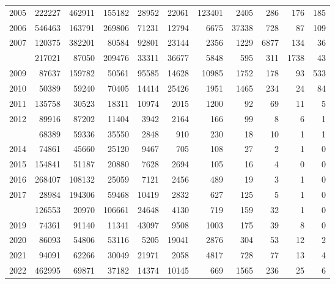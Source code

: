 \documentclass[
]{article}
\begin{document}
\begin{longtable}[t]{lrrrrrrrrrr}
2005 & 222227 & 462911 & 155182 & 28952 & 22061 & 123401 & 2405 & 286 & 176 & 185\\
2006 & 546463 & 163791 & 269806 & 71231 & 12794 & 6675 & 37338 & 728 & 87 & 109\\
2007 & 120375 & 382201 & 80584 & 92801 & 23144 & 2356 & 1229 & 6877 & 134 & 36\\
\addlinespace
2008 & 217021 & 87050 & 209476 & 33311 & 36677 & 5848 & 595 & 311 & 1738 & 43\\
2009 & 87637 & 159782 & 50561 & 95585 & 14628 & 10985 & 1752 & 178 & 93 & 533\\
2010 & 50389 & 59240 & 70405 & 14414 & 25426 & 1951 & 1465 & 234 & 24 & 84\\
2011 & 135758 & 30523 & 18311 & 10974 & 2015 & 1200 & 92 & 69 & 11 & 5\\
2012 & 89916 & 87202 & 11404 & 3942 & 2164 & 166 & 99 & 8 & 6 & 1\\
\addlinespace
2013 & 68389 & 59336 & 35550 & 2848 & 910 & 230 & 18 & 10 & 1 & 1\\
2014 & 74861 & 45660 & 25120 & 9467 & 705 & 108 & 27 & 2 & 1 & 0\\
2015 & 154841 & 51187 & 20880 & 7628 & 2694 & 105 & 16 & 4 & 0 & 0\\
2016 & 268407 & 108132 & 25059 & 7121 & 2456 & 489 & 19 & 3 & 1 & 0\\
2017 & 28984 & 194306 & 59468 & 10419 & 2832 & 627 & 125 & 5 & 1 & 0\\
\addlinespace
2018 & 126553 & 20970 & 106661 & 24648 & 4130 & 719 & 159 & 32 & 1 & 0\\
2019 & 74361 & 91140 & 11341 & 43097 & 9508 & 1003 & 175 & 39 & 8 & 0\\
2020 & 86093 & 54806 & 53116 & 5205 & 19041 & 2876 & 304 & 53 & 12 & 2\\
2021 & 94091 & 62266 & 30049 & 21971 & 2058 & 4817 & 728 & 77 & 13 & 4\\
2022 & 462995 & 69871 & 37182 & 14374 & 10145 & 669 & 1565 & 236 & 25 & 6\\*
\end{longtable}
\end{document}
